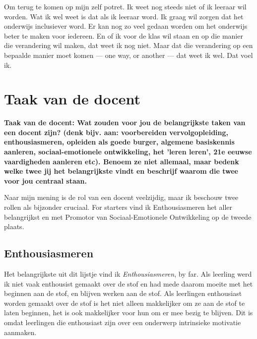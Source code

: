 \documentclass{article}
\begin{document}
            Om terug te komen op mijn zelf potret. Ik weet nog steeds niet of ik leeraar wil worden. Wat ik wel weet is dat als ik leeraar word. Ik graag wil zorgen dat het onderwijs inclusiever word. Er kan nog zo veel gedaan worden om het onderwijs beter te maken voor iedereen. En of ik voor de klas wil staan en op die manier die verandering wil maken, dat weet ik nog niet. Maar dat die verandering op een bepaalde manier moet komen — one way, or another — dat weet ik wel. Dat voel ik.

    \newpage
    

    \section{Taak van de docent}

        \textbf{Taak van de docent: Wat zouden voor jou de belangrijkste taken van een docent zijn? (denk bijv. aan: voorbereiden vervolgopleiding, enthousiasmeren, opleiden als goede burger, algemene basiskennis aanleren, sociaal-emotionele ontwikkeling, het 'leren leren', 21e eeuwse vaardigheden aanleren etc). Benoem ze niet allemaal, maar bedenk welke twee jij het belangrijkste vindt en beschrijf waarom die twee voor jou centraal staan.}
        
        Naar mijn mening is de rol van een docent veelzijdig, maar ik beschouw twee rollen als bijzonder cruciaal. For starters vind ik Enthousiasmeren het aller belangrijkst en met Promotor van Sociaal-Emotionele Ontwikkeling op de tweede plaats.
        
        \subsection{Enthousiasmeren}

            Het belangrijkste uit dit lijstje vind ik \textit{Enthousiasmeren}, by far. Als leerling werd ik niet vaak enthousist gemaakt over de stof en had mede daarom moeite met het beginnen aan de stof, en blijven werken aan de stof. Als leerlingen enthousiast worden gemaakt over de stof is het niet alleen makkelijker om ze aan de stof te laten beginnen, het is ook makkelijker voor hun om er mee bezig te blijven. Dit is omdat leerlingen die enthousiast zijn over een onderwerp intrinsieke motivatie aanmaken.\cite{enthusiasm-creates-motivation}
            
\end{document}
